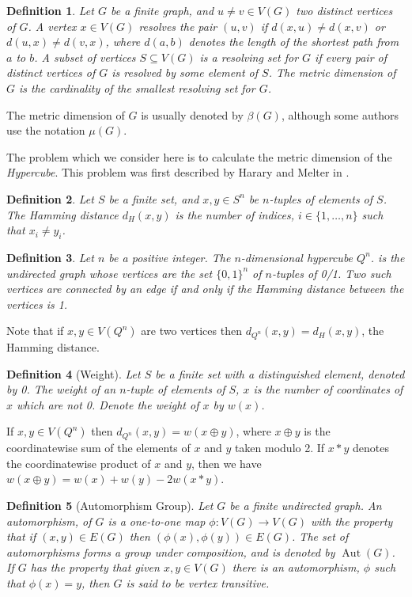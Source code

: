 \documentclass{article}
\newtheorem{definition}{Definition}
\DeclareMathOperator{\Aut}{Aut}
\begin{document}
\begin{definition}
  Let $G$ be a finite graph, and $u \ne v \in V(G)$ two distinct
  vertices of $G$.  A vertex $x \in V(G)$ \emph{resolves} the pair
  $(u,v)$ if $d(x,u) \ne d(x,v)$ or $d(u,x) \ne d(v,x)$, where
  $d(a,b)$ denotes the length of the shortest path from $a$ to $b$.
  A subset of vertices $S \subseteq V(G)$ is a \emph{resolving set}
  for $G$ if every pair of distinct vertices of $G$ is resolved by
  some element of $S$.  The \emph{metric dimension} of $G$ is the
  cardinality of the smallest resolving set for $G$.
\end{definition}
The metric dimension of $G$ is usually denoted by $\beta(G)$, although
some authors use the notation $\mu(G)$.

The problem which we consider here is to calculate the metric
dimension of the \emph{Hypercube}.
This problem was first described by Harary and Melter in
\cite{harary1976metric}. 

\begin{definition}
  Let $S$ be a finite set, and $x,y \in S^n$ be $n$-tuples of elements
  of $S$.  The \emph{Hamming distance} $d_H(x,y)$ is the number of
  indices, $i \in \{1, \dots, n\}$ such that $x_i \ne y_i$.
\end{definition}

\begin{definition}
  Let $n$ be a positive integer. The $n$-dimensional \emph{hypercube}
  $Q^n$. is the undirected graph whose vertices are the set
  $\{0,1\}^n$ of $n$-tuples of 0/1.  Two such vertices are connected
  by an edge if and only if the Hamming distance between the vertices
  is 1.
\end{definition}
Note that if $x,y \in V(Q^n)$ are two vertices then $d_{Q^n}(x,y) =
d_H(x,y)$, the Hamming distance.
\begin{definition}[Weight]
  Let $S$ be a finite set with a distinguished element, denoted by 0.
  The \emph{weight} of an $n$-tuple of elements of $S$, $x$ is the number
  of coordinates of $x$ which are not 0.  Denote the weight of $x$ by $w(x)$.
\end{definition}

If $x,y \in V(Q^n)$ then $d_{Q^n}(x,y) = w(x \oplus y)$, where $x
\oplus y$ is the coordinatewise sum of the elements of $x$ and $y$
taken modulo 2.  If $x * y$ denotes the coordinatewise product of $x$
and $y$, then we have $w(x \oplus y) = w(x) + w(y) - 2 w(x * y)$.

\begin{definition}[Automorphism Group]
  Let $G$ be a finite undirected graph.  An \emph{automorphism}, of
  $G$ is a one-to-one map $\phi: V(G) \rightarrow V(G)$ with the
  property that if $(x,y) \in E(G)$ then
  $(\phi(x), \phi(y)) \in E(G)$.  The set of automorphisms forms a
  group under composition, and is denoted by $\Aut(G)$.  If $G$ has
  the property that given $x, y \in V(G)$ there is an automorphism,
  $\phi$ such that $\phi(x) = y$, then $G$ is said to be \emph{vertex
    transitive}.
  
\end{definition}
\end{document}
